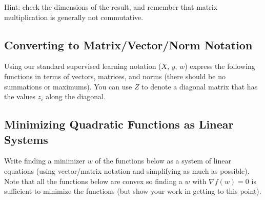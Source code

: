 \documentclass{article}
\begin{document}
Hint: check the dimensions of the result, and remember that matrix multiplication is generally not commutative.


\subsection{Converting to Matrix/Vector/Norm Notation}

Using our standard supervised learning notation ($X$, $y$, $w$)
express the following functions in terms of vectors, matrices, and norms (there should be no summations or maximums).
You can use $Z$ to denote a diagonal matrix that has the values $z_i$ along the diagonal.


\subsection{Minimizing Quadratic Functions as Linear Systems}

Write finding a minimizer $w$ of the functions below as a system of linear equations (using vector/matrix notation and simplifying as much as possible). Note that all the functions below are convex  so finding a $w$ with $\nabla f(w) = 0$ is sufficient to minimize the functions (but show your work in getting to this point).
\end{document}
